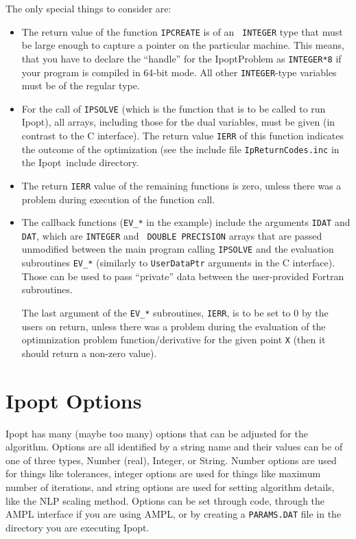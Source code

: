 \documentclass[letter,10pt]{article}
\newcommand{\Ipopt}{{\sc Ipopt}}
\begin{document}
The only special things to consider are:
\begin{itemize}
\item The return value of the function {\tt IPCREATE} is of an {\tt
    INTEGER} type that must be large enough to capture a pointer
  on the particular machine.  This means, that you have to declare
  the ``handle'' for the IpoptProblem as {\tt INTEGER*8} if your
  program is compiled in 64-bit mode.  All other {\tt INTEGER}-type
  variables must be of the regular type.
\item For the call of {\tt IPSOLVE} (which is the function that is to
  be called to run \Ipopt), all arrays, including those for the dual
  variables, must be given (in contrast to the C interface).  The
  return value {\tt IERR} of this function indicates the outcome of
  the optimization (see the include file {\tt IpReturnCodes.inc} in
  the \Ipopt\ include directory.
\item The return {\tt IERR} value of the remaining functions is zero,
  unless there was a problem during execution of the function call.
\item The callback functions ({\tt EV\_*} in the example) include the
  arguments {\tt IDAT} and {\tt DAT}, which are {\tt INTEGER} and {\tt
    DOUBLE PRECISION} arrays that are passed unmodified between the
  main program calling {\tt IPSOLVE} and the evaluation subroutines
  {\tt EV\_*} (similarly to {\tt UserDataPtr} arguments in the C
  interface).  Those can be used to pass ``private'' data between
  the user-provided Fortran subroutines.

  The last argument of the {\tt EV\_*} subroutines, {\tt IERR}, is to
  be set to 0 by the users on return, unless there was a problem
  during the evaluation of the optimnization problem
  function/derivative for the given point {\tt X} (then it should
  return a non-zero value).
\end{itemize}


\section{Ipopt Options}\label{sec.options}
Ipopt has many (maybe too many) options that can be adjusted for the
algorithm.  Options are all identified by a string name and their
values can be of one of three types, Number (real), Integer, or
String. Number options are used for things like tolerances, integer
options are used for things like maximum number of iterations, and
string options are used for setting algorithm details, like the NLP
scaling method. Options can be set through code, through the AMPL
interface if you are using AMPL, or by creating a {\tt PARAMS.DAT}
file in the directory you are executing Ipopt.
\end{document}
